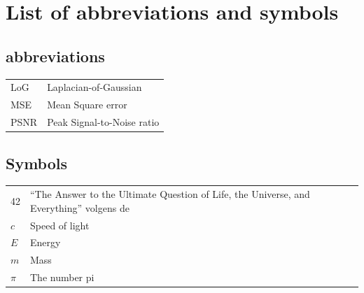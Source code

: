 \documentclass[master=ebmt,masteroption=biai]{kulemt}
\begin{document}
\begin{preface}
\end{preface}

\tableofcontents*

\begin{abstract}
  This \texttt{abstract} environment provides a summary of the work, which may or may not be extensive.
  The intention is that this should be limited to 1 page.


\end{abstract}

\listoffiguresandtables
\chapter{List of abbreviations and symbols}
\section*{abbreviations}

\begin{flushleft}
  \renewcommand{\arraystretch}{1.1}
  \begin{tabularx}{\textwidth}{@{}p{12mm}X@{}}
    LoG   & Laplacian-of-Gaussian \\
    MSE   & Mean Square error \\
    PSNR  & Peak Signal-to-Noise ratio \\
  \end{tabularx}
\end{flushleft}


\section*{Symbols}
\begin{flushleft}
  \renewcommand{\arraystretch}{1.1}
  \begin{tabularx}{\textwidth}{@{}p{12mm}X@{}}
    42    & ``The Answer to the Ultimate Question of Life, the Universe,
            and Everything'' volgens de \cite{h2g2} \\
    $c$   & Speed of light \\
    $E$   & Energy \\
    $m$   & Mass \\
    $\pi$ & The number pi \\
  \end{tabularx}
\end{flushleft}
\end{document}
